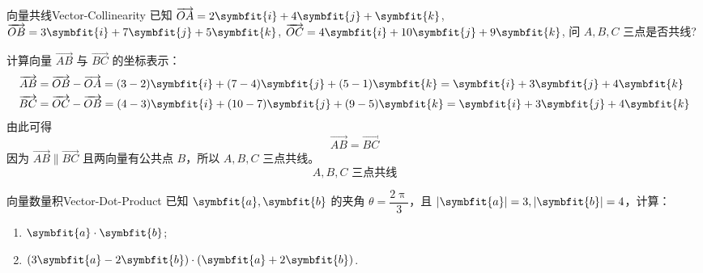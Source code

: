 \begin{problem}{向量共线}{Vector-Collinearity}
    已知 $\overrightarrow{OA} = 2\symbfit{i} + 4\symbfit{j} + \symbfit{k}$, $\overrightarrow{OB} = 3\symbfit{i} + 7\symbfit{j} + 5\symbfit{k}$, $\overrightarrow{OC} = 4\symbfit{i} + 10\symbfit{j} + 9\symbfit{k}$, 问 $A, B, C$ 三点是否共线?
\end{problem}

\begin{solution}
    计算向量 $\overrightarrow{AB}$ 与 $\overrightarrow{BC}$ 的坐标表示：
    \begin{equation}
        \begin{aligned}
            \overrightarrow{AB} & = \overrightarrow{OB} - \overrightarrow{OA} = (3-2)\symbfit{i} + (7-4)\symbfit{j} + (5-1)\symbfit{k} = \symbfit{i} + 3\symbfit{j} + 4\symbfit{k}  \\
            \overrightarrow{BC} & = \overrightarrow{OC} - \overrightarrow{OB} = (4-3)\symbfit{i} + (10-7)\symbfit{j} + (9-5)\symbfit{k} = \symbfit{i} + 3\symbfit{j} + 4\symbfit{k}
        \end{aligned}
    \end{equation}
    由此可得
    \begin{equation}
        \overrightarrow{AB} = \overrightarrow{BC}
    \end{equation}
    因为 $\overrightarrow{AB} \parallel \overrightarrow{BC}$ 且两向量有公共点 $B$，所以 $A, B, C$ 三点共线。
    \begin{equation}
        \boxed{A, B, C \text{ 三点共线}}
    \end{equation}
\end{solution}

\begin{problem}{向量数量积}{Vector-Dot-Product}
    已知 $\symbfit{a}, \symbfit{b}$ 的夹角 $\theta = \dfrac{2\uppi}{3}$，且 $|\symbfit{a}| = 3, |\symbfit{b}| = 4$，计算：
    \begin{enumerate}
        \item $\symbfit{a} \cdot \symbfit{b}$;
        \item $(3\symbfit{a} - 2\symbfit{b}) \cdot (\symbfit{a} + 2\symbfit{b})$.
    \end{enumerate}
\end{problem}

